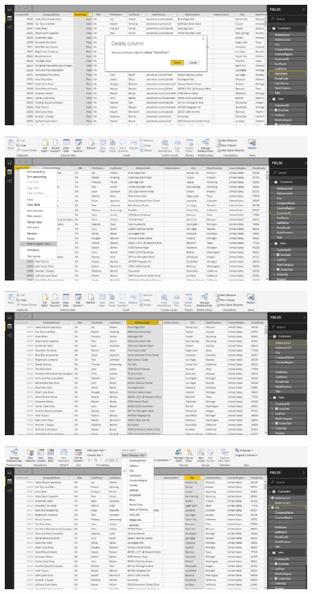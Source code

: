 	\begin{center}
	\includegraphics[width=15cm]{./Imagenes/EJER1T2(2)}
	\end{center}	

	\begin{center}
	\includegraphics[width=15cm]{./Imagenes/EJER1T2(3)}
	\end{center}	

	\begin{center}
	\includegraphics[width=15cm]{./Imagenes/EJER1T2(4)}
	\end{center}	

	\begin{center}
	\includegraphics[width=15cm]{./Imagenes/EJER1T2(5)}
	\end{center}	

